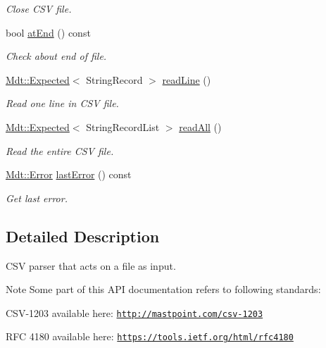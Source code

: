\begin{DoxyCompactItemize}
\begin{DoxyCompactList}\small\item\em Close C\+SV file. \end{DoxyCompactList}\item 
bool \hyperlink{class_mdt_1_1_plain_text_1_1_csv_file_parser_af71b58865205fac3eebd00b416f58a2f}{at\+End} () const 
\begin{DoxyCompactList}\small\item\em Check about end of file. \end{DoxyCompactList}\item 
\hyperlink{class_mdt_1_1_expected}{Mdt\+::\+Expected}$<$ String\+Record $>$ \hyperlink{class_mdt_1_1_plain_text_1_1_csv_file_parser_ab0b04108ed3e2ea4fa272567d7bed2ed}{read\+Line} ()
\begin{DoxyCompactList}\small\item\em Read one line in C\+SV file. \end{DoxyCompactList}\item 
\hyperlink{class_mdt_1_1_expected}{Mdt\+::\+Expected}$<$ String\+Record\+List $>$ \hyperlink{class_mdt_1_1_plain_text_1_1_csv_file_parser_a205ee7b5fb424e48652ffeb722f2f9cb}{read\+All} ()
\begin{DoxyCompactList}\small\item\em Read the entire C\+SV file. \end{DoxyCompactList}\item 
\hyperlink{class_mdt_1_1_error}{Mdt\+::\+Error} \hyperlink{class_mdt_1_1_plain_text_1_1_csv_file_parser_a7c9d6b5675ee9d5b84d99197264ebffb}{last\+Error} () const \hypertarget{class_mdt_1_1_plain_text_1_1_csv_file_parser_a7c9d6b5675ee9d5b84d99197264ebffb}{}\label{class_mdt_1_1_plain_text_1_1_csv_file_parser_a7c9d6b5675ee9d5b84d99197264ebffb}

\begin{DoxyCompactList}\small\item\em Get last error. \end{DoxyCompactList}\end{DoxyCompactItemize}


\subsection{Detailed Description}
C\+SV parser that acts on a file as input. 

\begin{DoxyNote}{Note}
Some part of this A\+PI documentation refers to following standards\+: \begin{DoxyItemize}
\item C\+S\+V-\/1203 available here\+: \href{http://mastpoint.com/csv-1203}{\tt http\+://mastpoint.\+com/csv-\/1203} \item R\+FC 4180 available here\+: \href{https://tools.ietf.org/html/rfc4180}{\tt https\+://tools.\+ietf.\+org/html/rfc4180} \end{DoxyItemize}

\end{DoxyNote}


